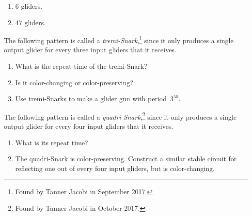 \begin{multicols}{2}
\begin{problem}
\begin{enumerate}[label=\bf\color{ocre}(\alph*)]
			\item $6$ gliders.
			
			\item $47$ gliders.
		\end{enumerate}
	\end{problem}
	
	
	\mfilbreak
	
	
	\begin{problem}\label{exer:tremi_snark}
		The following pattern is called a \emph{tremi-Snark},\footnote{Found by Tanner Jacobi in September 2017.} since it only produces a single output glider for every three input gliders that it receives.
		
		\begin{center}
		\end{center}
		
		\begin{enumerate}[label=\bf\color{ocre}(\alph*)]
			\item What is the repeat time of the tremi-Snark?%
			
			\item Is it color-changing or color-preserving?%
			
			\item Use tremi-Snarks to make a glider gun with period~$3^{50}$.
		\end{enumerate}
	\end{problem}
	
	
	\mfilbreak
	
	
	\begin{problem}\label{exer:quadri_snark}
		The following pattern is called a \emph{quadri-Snark},\footnote{Found by Tanner Jacobi in October 2017.} since it only produces a single output glider for every four input gliders that it receives.
		
		\begin{center}
		\end{center}
		
		\begin{enumerate}[label=\bf\color{ocre}(\alph*)]
			\item What is its repeat time?%
			
			\item The quadri-Snark is color-preserving. Construct a similar stable circuit for reflecting one out of every four input gliders, but is color-changing.%
			

\end{enumerate}
\end{problem}
\end{multicols}
